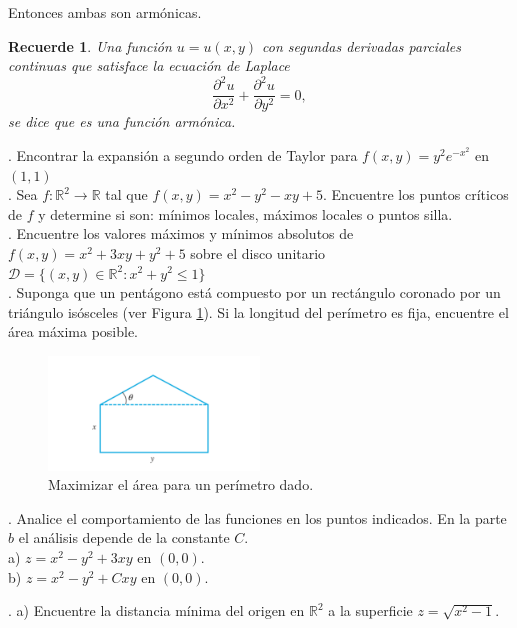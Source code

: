 \documentclass[letterpaper]{article}
\newtheorem*{remark}{Recuerde}
\renewcommand{\*}{\cdot}
\theoremstyle{definition}
\begin{document}
Entonces ambas son armónicas.

\begin{remark}
Una función $u = u(x,y)$ con segundas derivadas parciales continuas que satisface la ecuación de Laplace  $$ \dfrac{\partial^2 u}{\partial x^2} + \dfrac{\partial^2 u}{\partial y^2}= 0,$$ se dice que es una función armónica.
\end{remark}

. Encontrar la expansión a segundo orden de Taylor para $f(x,y) = y^2e^{-x^2}$ en $(1,1)$\\

. Sea $f: \mathbb{R}^2 \longrightarrow \mathbb{R}$ tal que  $f(x,y) = x^2 - y^2 - xy + 5$. Encuentre los puntos críticos de $f$ y determine si son: mínimos locales, máximos locales o puntos silla.\\

. Encuentre los valores máximos y mínimos absolutos de $f(x,y) = x^2 + 3xy + y^2 + 5$ sobre el disco unitario $\mathcal{D} = \{(x,y) \in \mathbb{R}^2 : x^2 + y^2 \leq 1 \}$\\

. Suponga que un pentágono está compuesto por un rectángulo coronado por un triángulo isósceles (ver Figura \ref{fig:1}). Si la longitud del perímetro es fija, encuentre el área máxima posible.

\begin{figure}[h]
    \centering
    \includegraphics[width=0.5\textwidth]{img/figT}
    \caption{Maximizar el área para un perímetro dado.}
    \label{fig:1}
\end{figure}


. Analice el comportamiento de las funciones en los puntos indicados. En la parte $b$ el análisis depende de la constante $C$.\\


a) $z = x^2 - y^2 + 3xy $ en $(0,0)$.\\
b)  $z = x^2 - y^2 + Cxy $ en $(0,0)$.




. a) Encuentre la distancia mínima del origen en $\mathbb{R}^2$  a la superficie $z = \sqrt{x^2 - 1}$.\\
\end{document}
